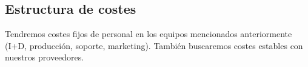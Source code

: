 \subsection{Estructura de costes}


Tendremos costes fijos de personal en los equipos mencionados anteriormente (I+D, producción, soporte, marketing). También buscaremos costes estables con nuestros proveedores.